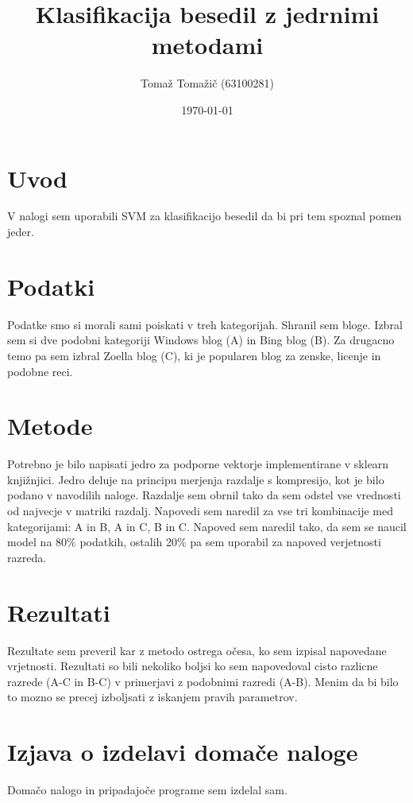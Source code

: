 \documentclass[a4paper,11pt]{article}
\title{Klasifikacija besedil z jedrnimi metodami}
\author{Tomaž Tomažič (63100281)}
\date{\today}
\begin{document}
\maketitle

\section{Uvod}

V nalogi sem uporabili SVM za klasifikacijo besedil da bi pri tem spoznal pomen jeder.

\section{Podatki}

Podatke smo si morali sami poiskati v treh kategorijah. Shranil sem bloge. Izbral sem si dve podobni kategoriji Windows blog (A) in Bing blog (B). Za drugacno temo pa sem izbral Zoella blog (C), ki je popularen blog za zenske, licenje in podobne reci.

\section{Metode}

Potrebno je bilo napisati jedro za podporne vektorje implementirane v sklearn knjižnjici. Jedro deluje na principu merjenja razdalje s kompresijo, kot je bilo podano v navodilih naloge. Razdalje sem obrnil tako da sem odstel vse vrednosti od najvecje v matriki razdalj. Napovedi sem naredil za vse tri kombinacije med kategorijami: A in B, A in C, B in C. Napoved sem naredil tako, da sem se naucil model na 80\% podatkih, ostalih 20\% pa sem uporabil za napoved verjetnosti razreda.

\section{Rezultati}
Rezultate sem preveril kar z metodo ostrega očesa, ko sem izpisal napovedane vrjetnosti.
Rezultati so bili nekoliko boljsi ko sem napovedoval cisto razlicne razrede (A-C in B-C) v primerjavi z podobnimi razredi (A-B). Menim da bi bilo to mozno se precej izboljsati z iskanjem pravih parametrov.

\section{Izjava o izdelavi domače naloge}
Domačo nalogo in pripadajoče programe sem izdelal sam.
\end{document}
